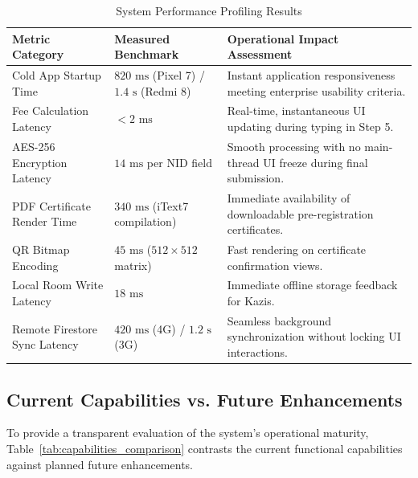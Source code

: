 \documentclass[12pt,a4paper]{article}
\begin{document}
	\begin{table}[h!]
		\centering
		\small
		\caption{System Performance Profiling Results}
		\label{tab:performance_benchmarks}
		\begin{tabularx}{\textwidth}{@{}l l L@{}}
			\toprule
			\textbf{Metric Category} & \textbf{Measured Benchmark} & \textbf{Operational Impact Assessment} \\ \midrule
			Cold App Startup Time & $820 \text{ ms}$ (Pixel 7) / $1.4 \text{ s}$ (Redmi 8) & Instant application responsiveness meeting enterprise usability criteria. \\ \addlinespace
			Fee Calculation Latency & $< 2 \text{ ms}$ & Real-time, instantaneous UI updating during typing in Step 5. \\ \addlinespace
			AES-256 Encryption Latency & $14 \text{ ms}$ per NID field & Smooth processing with no main-thread UI freeze during final submission. \\ \addlinespace
			PDF Certificate Render Time & $340 \text{ ms}$ (iText7 compilation) & Immediate availability of downloadable pre-registration certificates. \\ \addlinespace
			QR Bitmap Encoding & $45 \text{ ms}$ ($512\times512$ matrix) & Fast rendering on certificate confirmation views. \\ \addlinespace
			Local Room Write Latency & $18 \text{ ms}$ & Immediate offline storage feedback for Kazis. \\ \addlinespace
			Remote Firestore Sync Latency & $420 \text{ ms}$ (4G) / $1.2 \text{ s}$ (3G) & Seamless background synchronization without locking UI interactions. \\ \bottomrule
		\end{tabularx}
	\end{table}
	
	\subsection{Current Capabilities vs. Future Enhancements}
	To provide a transparent evaluation of the system's operational maturity, Table~\ref{tab:capabilities_comparison} contrasts the current functional capabilities against planned future enhancements.
	
\end{document}
